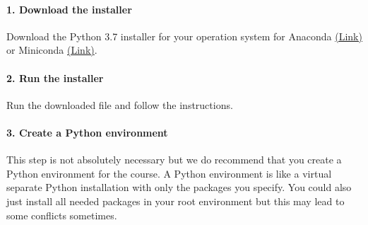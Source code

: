\documentclass[a4paper]{article}
\begin{document}
\paragraph{1. Download the installer} Download the Python 3.7 installer for your operation system for Anaconda \href{https://www.anaconda.com/distribution/}{(Link)} or Miniconda \href{https://docs.conda.io/en/latest/miniconda.html}{(Link)}.

\paragraph{2. Run the installer} Run the downloaded file and follow the instructions.

\paragraph{3. Create a Python environment} This step is not absolutely necessary but we do recommend that you create a Python environment for the course. A Python environment is like a virtual separate Python installation with only the packages you specify. You could also just install all needed packages in your root environment but this may lead to some conflicts sometimes.

\clearpage{}
\end{document}
